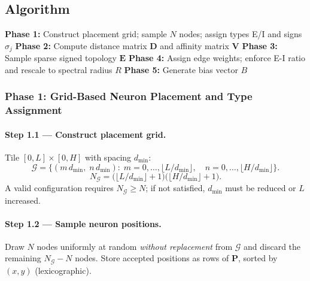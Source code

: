 \documentclass[11pt]{article}
\begin{document}
\subsection{Algorithm}

\begin{algorithm}[H]
\caption{Synthetic Neuronal Network Topology}
\begin{algorithmic}[1]
\STATE \textbf{Phase 1:} Construct placement grid; sample $N$ nodes;
       assign types E/I and signs $\sigma_j$
\STATE \textbf{Phase 2:} Compute distance matrix $\mathbf{D}$ and affinity
       matrix $\mathbf{V}$
\STATE \textbf{Phase 3:} Sample sparse signed topology $\mathbf{E}$
\STATE \textbf{Phase 4:} Assign edge weights; enforce E-I ratio and
       rescale to spectral radius $R$
\STATE \textbf{Phase 5:} Generate bias vector $B$
\end{algorithmic}
\end{algorithm}

\subsubsection{Phase 1: Grid-Based Neuron Placement and Type
               Assignment}

\paragraph{Step 1.1 --- Construct placement grid.}
Tile $[0,L]\times[0,H]$ with spacing $d_{\text{min}}$:
\begin{equation}
  \mathcal{G} =
  \bigl\{(m\,d_{\text{min}},\;n\,d_{\text{min}}):\;
  m=0,\dots,\lfloor L/d_{\text{min}}\rfloor,\quad
  n=0,\dots,\lfloor H/d_{\text{min}}\rfloor\bigr\}.
\end{equation}
\begin{equation}
  N_{\mathcal{G}} =
  \bigl(\lfloor L/d_{\text{min}}\rfloor+1\bigr)
  \bigl(\lfloor H/d_{\text{min}}\rfloor+1\bigr).
\end{equation}
A valid configuration requires $N_{\mathcal{G}}\geq N$; if not
satisfied, $d_{\text{min}}$ must be reduced or $L$ increased.

\paragraph{Step 1.2 --- Sample neuron positions.}
Draw $N$ nodes uniformly at random \emph{without replacement} from
$\mathcal{G}$ and discard the remaining $N_{\mathcal{G}}-N$ nodes.
Store accepted positions as rows of $\mathbf{P}$, sorted by
$(x,y)$ (lexicographic).
\end{document}
